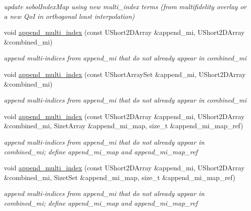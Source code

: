 \begin{DoxyCompactItemize}
\begin{DoxyCompactList}\small\item\em update sobol\+Index\+Map using new multi\+\_\+index terms (from multifidelity overlay or a new QoI in orthogonal least interpolation) \end{DoxyCompactList}\item 
void \hyperlink{classPecos_1_1SharedOrthogPolyApproxData_a0ee0bf875553fe6a252e52a15e1f45c7}{append\+\_\+multi\+\_\+index} (const U\+Short2\+D\+Array \&append\+\_\+mi, U\+Short2\+D\+Array \&combined\+\_\+mi)
\begin{DoxyCompactList}\small\item\em append multi-\/indices from append\+\_\+mi that do not already appear in combined\+\_\+mi \end{DoxyCompactList}\item 
void \hyperlink{classPecos_1_1SharedOrthogPolyApproxData_ad4251303923381e36766cad6445536fe}{append\+\_\+multi\+\_\+index} (const U\+Short\+Array\+Set \&append\+\_\+mi, U\+Short2\+D\+Array \&combined\+\_\+mi)
\begin{DoxyCompactList}\small\item\em append multi-\/indices from append\+\_\+mi that do not already appear in combined\+\_\+mi \end{DoxyCompactList}\item 
void \hyperlink{classPecos_1_1SharedOrthogPolyApproxData_a70a7a0374c65a96d7bb709ad8bacdf77}{append\+\_\+multi\+\_\+index} (const U\+Short2\+D\+Array \&append\+\_\+mi, U\+Short2\+D\+Array \&combined\+\_\+mi, Sizet\+Array \&append\+\_\+mi\+\_\+map, size\+\_\+t \&append\+\_\+mi\+\_\+map\+\_\+ref)
\begin{DoxyCompactList}\small\item\em append multi-\/indices from append\+\_\+mi that do not already appear in combined\+\_\+mi; define append\+\_\+mi\+\_\+map and append\+\_\+mi\+\_\+map\+\_\+ref \end{DoxyCompactList}\item 
void \hyperlink{classPecos_1_1SharedOrthogPolyApproxData_a0cfa6210c23b848fe07c8618e6e800be}{append\+\_\+multi\+\_\+index} (const U\+Short2\+D\+Array \&append\+\_\+mi, U\+Short2\+D\+Array \&combined\+\_\+mi, Sizet\+Set \&append\+\_\+mi\+\_\+map, size\+\_\+t \&append\+\_\+mi\+\_\+map\+\_\+ref)
\begin{DoxyCompactList}\small\item\em append multi-\/indices from append\+\_\+mi that do not already appear in combined\+\_\+mi; define append\+\_\+mi\+\_\+map and append\+\_\+mi\+\_\+map\+\_\+ref \end{DoxyCompactList}\item 

\end{DoxyCompactItemize}

